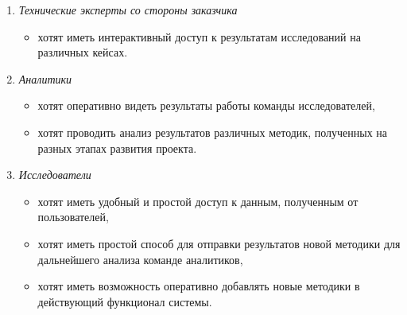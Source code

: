 \begin{enumerate}
    \item {
        \textit{Технические эксперты со стороны заказчика}
        \begin{itemize}
            \item хотят иметь интерактивный доступ к результатам исследований на различных кейсах.
        \end{itemize}
    }
    \item {
        \textit{Аналитики}
        \begin{itemize}
            \item хотят оперативно видеть результаты работы команды исследователей,
            \item хотят проводить анализ результатов различных методик, полученных на разных этапах развития проекта.
        \end{itemize}
    }
    \item {
        \textit{Исследователи}
        \begin{itemize}
            \item хотят иметь удобный и простой доступ к данным, полученным от пользователей,
            \item хотят иметь простой способ для отправки результатов новой методики для дальнейшего анализа команде аналитиков,
            \item хотят иметь возможность оперативно добавлять новые методики в действующий функционал системы.
        \end{itemize}
    }
\end{enumerate}

